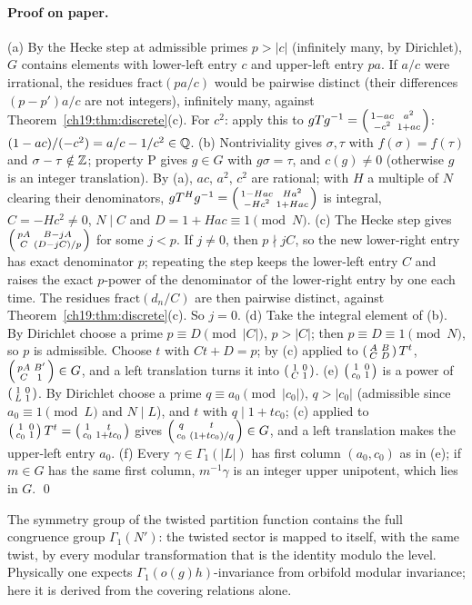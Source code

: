 \paragraph{Proof on paper.}  (a) By the Hecke step at admissible primes $p>|c|$ (infinitely many, by Dirichlet), $G$ contains elements with
lower-left entry $c$ and upper-left entry $pa$.  If $a/c$ were irrational, the residues $\mathrm{fract}(pa/c)$ would be pairwise distinct (their
differences $(p-p')a/c$ are not integers), infinitely many, against Theorem~\ref{ch19:thm:discrete}(c).  For $c^2$: apply this to
$gTg^{-1}=\left(\begin{smallmatrix}1-ac&a^2\\-c^2&1+ac\end{smallmatrix}\right)$: $(1-ac)/(-c^2)=a/c-1/c^2\in{\mathbb{Q}}$.  (b) Nontriviality gives $\sigma,\tau$ with $f(\sigma)=f(\tau)$ and
$\sigma-\tau\notin{\mathbb{Z}}$; property P gives $g\in G$ with $g\sigma=\tau$, and $c(g)\ne0$ (otherwise $g$ is an integer translation).  By (a), $ac$, $a^2$, $c^2$
are rational; with $H$ a multiple of $N$ clearing their denominators, $gT^Hg^{-1}=\left(\begin{smallmatrix}1-Hac&Ha^2\\-Hc^2&1+Hac\end{smallmatrix}\right)$ is integral,
$C=-Hc^2\ne0$, $N\mid C$ and $D=1+Hac\equiv1\pmod N$.  (c) The Hecke step gives $\left(\begin{smallmatrix}pA&B-jA\\C&(D-jC)/p\end{smallmatrix}\right)$ for some $j<p$.  If
$j\ne0$, then $p\nmid jC$, so the new lower-right entry has exact denominator $p$; repeating the step keeps the lower-left entry $C$ and
raises the exact $p$-power of the denominator of the lower-right entry by one each time.  The residues $\mathrm{fract}(d_n/C)$ are then pairwise
distinct, against Theorem~\ref{ch19:thm:discrete}(c).  So $j=0$.  (d) Take the integral element of (b).  By Dirichlet choose a prime $p\equiv
D\pmod{|C|}$, $p>|C|$; then $p\equiv D\equiv1\pmod N$, so $p$ is admissible.  Choose $t$ with $Ct+D=p$; by (c) applied to $\left(\begin{smallmatrix}A&B\\C&D\end{smallmatrix}\right) T^t$,
$\left(\begin{smallmatrix}pA&B'\\C&1\end{smallmatrix}\right)\in G$, and a left translation turns it into $\left(\begin{smallmatrix}1&0\\C&1\end{smallmatrix}\right)$.  (e) $\left(\begin{smallmatrix}1&0\\c_0&1\end{smallmatrix}\right)$ is a power of
$\left(\begin{smallmatrix}1&0\\L&1\end{smallmatrix}\right)$.  By Dirichlet choose a prime $q\equiv a_0\pmod{|c_0|}$, $q>|c_0|$ (admissible since $a_0\equiv1\pmod L$ and $N\mid L$), and $t$
with $q\mid1+tc_0$; (c) applied to $\left(\begin{smallmatrix}1&0\\c_0&1\end{smallmatrix}\right)T^t=\left(\begin{smallmatrix}1&t\\c_0&1+tc_0\end{smallmatrix}\right)$ gives $\left(\begin{smallmatrix}q&t\\c_0&(1+tc_0)/q\end{smallmatrix}\right)\in G$, and a left
translation makes the upper-left entry $a_0$.  (f) Every $\gamma\in\Gamma_1(|L|)$ has first column $(a_0,c_0)$ as in (e); if $m\in G$ has the same
first column, $m^{-1}\gamma$ is an integer upper unipotent, which lies in $G$. \qed
\begin{physics}The symmetry group of the twisted partition function contains the full congruence group $\Gamma_1(N')$: the twisted
sector is mapped to itself, with the same twist, by every modular transformation that is the identity modulo the level.  Physically
one expects $\Gamma_1(o(g)h)$-invariance from orbifold modular invariance; here it is derived from the covering relations alone.\end{physics}
